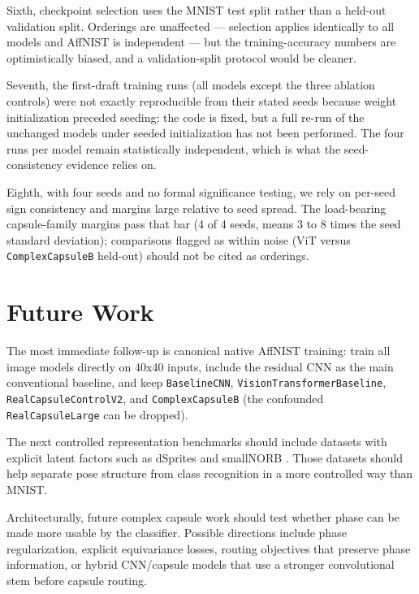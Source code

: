 \documentclass[11pt]{article}
\begin{document}
Sixth, checkpoint selection uses the MNIST test split rather than a held-out validation split. Orderings are unaffected --- selection applies identically to all models and AffNIST is independent --- but the training-accuracy numbers are optimistically biased, and a validation-split protocol would be cleaner.

Seventh, the first-draft training runs (all models except the three ablation controls) were not exactly reproducible from their stated seeds because weight initialization preceded seeding; the code is fixed, but a full re-run of the unchanged models under seeded initialization has not been performed. The four runs per model remain statistically independent, which is what the seed-consistency evidence relies on.

Eighth, with four seeds and no formal significance testing, we rely on per-seed sign consistency and margins large relative to seed spread. The load-bearing capsule-family margins pass that bar (4 of 4 seeds, means 3 to 8 times the seed standard deviation); comparisons flagged as within noise (ViT versus \texttt{ComplexCapsuleB} held-out) should not be cited as orderings.

\section{Future Work}
The most immediate follow-up is canonical native AffNIST training: train all image models directly on 40x40 inputs, include the residual CNN as the main conventional baseline, and keep \texttt{BaselineCNN}, \texttt{VisionTransformerBaseline}, \texttt{RealCapsuleControlV2}, and \texttt{ComplexCapsuleB} (the confounded \texttt{RealCapsuleLarge} can be dropped).

The next controlled representation benchmarks should include datasets with explicit latent factors such as dSprites \citep{dsprites} and smallNORB \citep{smallnorb}. Those datasets should help separate pose structure from class recognition in a more controlled way than MNIST.

Architecturally, future complex capsule work should test whether phase can be made more usable by the classifier. Possible directions include phase regularization, explicit equivariance losses, routing objectives that preserve phase information, or hybrid CNN/capsule models that use a stronger convolutional stem before capsule routing.
\end{document}
